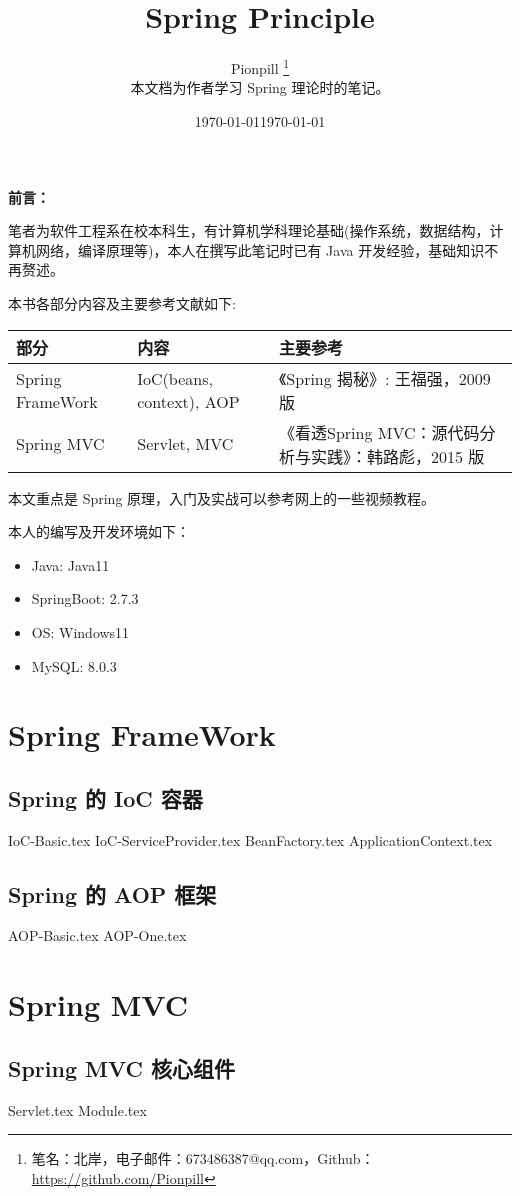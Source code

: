 \documentclass{PionpillNote-book}
\title{Spring Principle}
\author{
    Pionpill \footnote{笔名：北岸，电子邮件：673486387@qq.com，Github：\url{https://github.com/Pionpill}} \\
    本文档为作者学习 Spring 理论时的笔记。\\
}
\date{\today}
\begin{document}
\pagestyle{plain}
\maketitle

\noindent\textbf{前言：}

笔者为软件工程系在校本科生，有计算机学科理论基础(操作系统，数据结构，计算机网络，编译原理等)，本人在撰写此笔记时已有 Java 开发经验，基础知识不再赘述。

本书各部分内容及主要参考文献如下:
\begin{table}[H]
    \footnotesize
    \centering
    \setlength{\tabcolsep}{4mm}
    \begin{tabular}{l|l|l}
        \toprule
        \textbf{部分} & \textbf{内容} & \textbf{主要参考} \\
        \midrule
        Spring FrameWork & IoC(beans, context), AOP & 《Spring 揭秘》: 王福强，2009 版 \\
        Spring MVC & Servlet, MVC & 《看透Spring MVC：源代码分析与实践》：韩路彪，2015 版 \\
        \bottomrule
    \end{tabular}
\end{table}

本文重点是 Spring 原理，入门及实战可以参考网上的一些视频教程。

本人的编写及开发环境如下：
\begin{itemize}
    \item Java: Java11
    \item SpringBoot: 2.7.3
    \item OS: Windows11 
    \item MySQL: 8.0.3
\end{itemize}

\date{\today}
\newpage

\tableofcontents

\newpage

\setcounter{page}{1} 
\pagestyle{fancy}

\part{Spring FrameWork}
\chapter{Spring 的 IoC 容器}
{IoC-Basic.tex}
{IoC-ServiceProvider.tex}
{BeanFactory.tex}
{ApplicationContext.tex}
\chapter{Spring 的 AOP 框架}
{AOP-Basic.tex}
{AOP-One.tex}

\part{Spring MVC}
\chapter{Spring MVC 核心组件}
{Servlet.tex}
{Module.tex}
\end{document}

